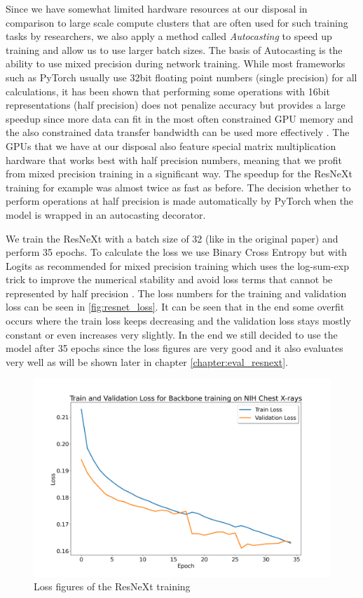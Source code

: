 Since we have somewhat limited hardware resources at our disposal in comparison to large scale compute clusters that are often used for such training tasks by researchers, we also apply a method called \textit{Autocasting} to speed up training and allow us to use larger batch sizes. The basis of Autocasting is the ability to use mixed precision during network training. While most frameworks such as PyTorch usually use 32bit floating point numbers (single precision) for all calculations, it has been shown that performing some operations with 16bit representations (half precision) does not penalize accuracy but provides a large speedup since more data can fit in the most often constrained GPU memory and the also constrained data transfer bandwidth can be used more effectively \autocite{micikevicius_mixed_2018}. The GPUs that we have at our disposal also feature special matrix multiplication hardware that works best with half precision numbers, meaning that we profit from mixed precision training in a significant way. The speedup for the ResNeXt training for example was almost twice as fast as before. The decision whether to perform operations at half precision is made automatically by PyTorch when the model is wrapped in an autocasting decorator.

We train the ResNeXt with a batch size of 32 (like in the original paper) and perform 35 epochs. To calculate the loss we use Binary Cross Entropy but with Logits as recommended for mixed precision training which uses the log-sum-exp trick to improve the numerical stability and avoid loss terms that cannot be represented by half precision \autocite{pytorch_team_automatic_nodate}. The loss numbers for the training and validation loss can be seen in \vref{fig:resnet_loss}. It can be seen that in the end some overfit occurs where the train loss keeps decreasing and the validation loss stays mostly constant or even increases very slightly. In the end we still decided to use the model after 35 epochs since the loss figures are very good and it also evaluates very well as will be shown later in chapter \vref{chapter:eval_resnext}.

\begin{figure}
	\centering
	\includegraphics[width=.7\linewidth]{img/loss_backbone_rcnn_35.png}
	\caption{Loss figures of the ResNeXt training}
	\label{fig:resnet_loss}
\end{figure}

